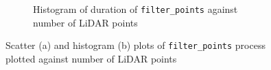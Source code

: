 \documentclass[../main.tex]{subfiles}
\begin{document}
\begin{figure}[htbp]
{\begin{subfigure}[t]{0.44\textwidth}
        \caption{Histogram of duration of \texttt{filter\_points} against number of LiDAR points}
        \label{fig:gbcache_filter_points_hist}
    \end{subfigure}
}
\caption{Scatter (a) and histogram (b) plots of \texttt{filter\_points} process plotted against number of LiDAR points}
\label{fig:gbcache_filter_points}
\end{figure}

\begin{figure}[htbp]
\centering
{}
\end{figure}
\end{document}
